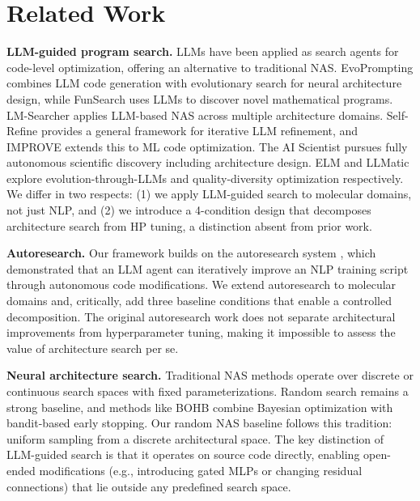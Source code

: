 \section{Related Work}
\label{sec:related_work}

\textbf{LLM-guided program search.}
LLMs have been applied as search agents for code-level optimization, offering an alternative to traditional NAS. EvoPrompting \citep{chen2023evoprompting} combines LLM code generation with evolutionary search for neural architecture design, while FunSearch \citep{romeraparedes2024funsearch} uses LLMs to discover novel mathematical programs. LM-Searcher \citep{hu2025lmsearcher} applies LLM-based NAS across multiple architecture domains. Self-Refine \citep{madaan2023selfrefine} provides a general framework for iterative LLM refinement, and IMPROVE \citep{xue2025improve} extends this to ML code optimization. The AI Scientist \citep{lu2024aiscientist} pursues fully autonomous scientific discovery including architecture design. ELM \citep{lehman2022elm} and LLMatic \citep{nasir2023llmatic} explore evolution-through-LLMs and quality-diversity optimization respectively. We differ in two respects: (1) we apply LLM-guided search to molecular domains, not just NLP, and (2) we introduce a 4-condition design that decomposes architecture search from HP tuning, a distinction absent from prior work.

\textbf{Autoresearch.}
Our framework builds on the autoresearch system \citep{karpathy2026autoresearch}, which demonstrated that an LLM agent can iteratively improve an NLP training script through autonomous code modifications. We extend autoresearch to molecular domains and, critically, add three baseline conditions that enable a controlled decomposition. The original autoresearch work does not separate architectural improvements from hyperparameter tuning, making it impossible to assess the value of architecture search per se.

\textbf{Neural architecture search.}
Traditional NAS methods operate over discrete \citep{elsken2019nas} or continuous search spaces with fixed parameterizations. Random search \citep{bergstra2012random} remains a strong baseline, and methods like BOHB \citep{falkner2018bohb} combine Bayesian optimization with bandit-based early stopping. Our random NAS baseline follows this tradition: uniform sampling from a discrete architectural space. The key distinction of LLM-guided search is that it operates on source code directly, enabling open-ended modifications (e.g., introducing gated MLPs or changing residual connections) that lie outside any predefined search space.

